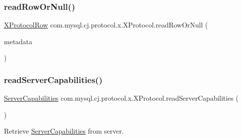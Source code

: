 \mbox{\label{classcom_1_1mysql_1_1cj_1_1protocol_1_1x_1_1_x_protocol_a44138b083a297b9a430e696b3952b52f}} 
\subsubsection{\texorpdfstring{read\+Row\+Or\+Null()}{readRowOrNull()}}
{\footnotesize\ttfamily \mbox{\hyperlink{classcom_1_1mysql_1_1cj_1_1protocol_1_1x_1_1_x_protocol_row}{X\+Protocol\+Row}} com.\+mysql.\+cj.\+protocol.\+x.\+X\+Protocol.\+read\+Row\+Or\+Null (\begin{DoxyParamCaption}\item[{\mbox{\hyperlink{interfacecom_1_1mysql_1_1cj_1_1protocol_1_1_column_definition}{Column\+Definition}}}]{metadata }\end{DoxyParamCaption})}

\mbox{\label{classcom_1_1mysql_1_1cj_1_1protocol_1_1x_1_1_x_protocol_ade4f8f02c047acca33185b6460027ddb}} 
\subsubsection{\texorpdfstring{read\+Server\+Capabilities()}{readServerCapabilities()}}
{\footnotesize\ttfamily \mbox{\hyperlink{interfacecom_1_1mysql_1_1cj_1_1protocol_1_1_server_capabilities}{Server\+Capabilities}} com.\+mysql.\+cj.\+protocol.\+x.\+X\+Protocol.\+read\+Server\+Capabilities (\begin{DoxyParamCaption}{ }\end{DoxyParamCaption})}

Retrieve \mbox{\hyperlink{interfacecom_1_1mysql_1_1cj_1_1protocol_1_1_server_capabilities}{Server\+Capabilities}} from server.

